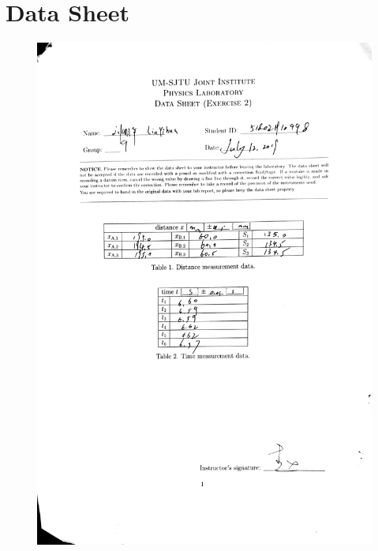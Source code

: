 \documentclass[a4paper]{report}
\begin{document}
	\section{Data Sheet}
	\begin{figure}[H]
		\centering
		\includegraphics[width=1\linewidth]{2.jpg}
	\end{figure}
\end{document}
